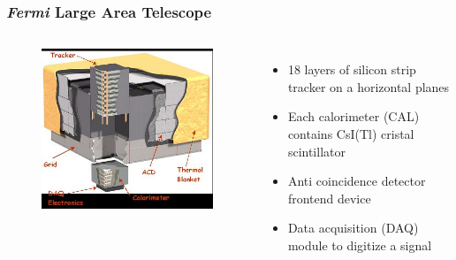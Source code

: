\documentclass{beamer}
\begin{document}
\begin{frame}
\frametitle{\textit{Fermi} Large Area Telescope}
\begin{columns}

  \centering
  \begin{figure}[h!]
  \includegraphics[width = \textwidth]{img/LATStructure}
  \end{figure}

  \begin{itemize}
  \item 18 layers of silicon strip tracker on a horizontal planes
  \item Each calorimeter (CAL) contains CsI(Tl) cristal scintillator
  \item Anti coincidence detector frontend device
  \item Data acquisition (DAQ) module to digitize a signal
  \end{itemize}
\end{columns}
\end{frame}
\end{document}
